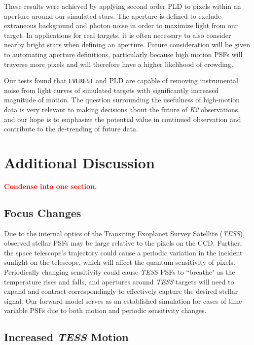 \documentclass[12pt,preprint]{aastex}
\begin{document}
These results were achieved by applying second order PLD to pixels within an aperture around our simulated stars. The aperture is defined to exclude extraneous background and photon noise in order to maximize light from our target. In applications for real targets, it is often necessary to also consider nearby bright stars when defining an aperture. Future consideration will be given to automating aperture definitions, particularly because high motion PSFs will traverse more pixels and will therefore have a higher likelihood of crowding.

Our tests found that \texttt{EVEREST} and PLD are capable of removing instrumental noise from light curves of simulated targets with significantly increased magnitude of motion. The question surrounding the usefulness of high-motion data is very relevant to making decisions about the future of \textit{K2} observations, and our hope is to emphasize the potential value in continued observation and contribute to the de-trending of future data.

\section{Additional Discussion}

\textcolor{red}{\textbf{Condense into one section.}}

\subsection{Focus Changes}

Due to the internal optics of the Transiting Exoplanet Survey Satellite (\textit{TESS}), observed stellar PSFs may be large relative to the pixels on the CCD. Further, the space telescope's trajectory could cause a periodic variation in the incident sunlight on the telescope, which will affect the quantum sensitivity of pixels. Periodically changing sensitivity could cause \textit{TESS} PSFs to ``breathe" as the temperature rises and falls, and apertures around \textit{TESS} targets will need to expand and contract correspondingly to effectively capture the desired stellar signal. Our forward model serves as an established simulation for cases of time-variable PSFs due to both motion and periodic sensitivity changes.


\subsection{Increased \textit{TESS} Motion}
\end{document}
